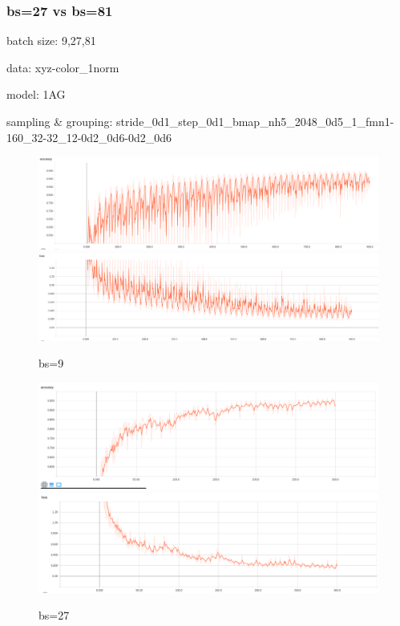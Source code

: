 \documentclass{article}
\begin{document}
\subsubsection{bs=27 vs bs=81}
batch size: 9,27,81 \par
data: xyz-color\_1norm\par
model: 1AG\par
sampling \& grouping: stride\_0d1\_step\_0d1\_bmap\_nh5\_2048\_0d5\_1\_fmn1-160\_32-32\_12-0d2\_0d6-0d2\_0d6\par
\begin{figure}[h!]
	\caption{bs=9}
	\centering
	\includegraphics[width=\textwidth]{acc_log-model_1AG-gsbb_2C1-bs9-xyz-color_1norm-2048-mat}
	\includegraphics[width=\textwidth]{loss_log-model_1AG-gsbb_2C1-bs9-xyz-color_1norm-2048-mat}
\end{figure}
\begin{figure}[h!]
	\caption{bs=27}
	\centering
	\includegraphics[width=\textwidth]{acc_log-model_1AG-gsbb_2C1-bs27-xyz-color_1norm-2048-mat}
	\includegraphics[width=\textwidth]{loss_log-model_1AG-gsbb_2C1-bs27-xyz-color_1norm-2048-mat}
\end{figure}
\end{document}
